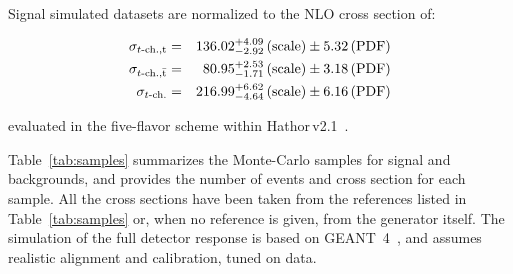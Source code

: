 
  
   
\clearpage

Signal simulated datasets are normalized to the NLO cross section of:

\begin{eqnarray}
\label{eq:sigmatot}
 \sigma_{t\textrm{-ch.,t}} &=&  136.02   ^{+4.09}_{-2.92}\,\textrm{(scale)}  \pm 5.32 \,\textrm{(PDF)}\nonumber\\
 \sigma_{t\textrm{-ch.,}\bar{\textrm{t}}} &=&  80.95   ^{+2.53}_{-1.71}\, \textrm{(scale)} \pm 3.18\,\textrm{(PDF)}\nonumber\\
 \sigma_{t\textrm{-ch.}} &=&  216.99   ^{+6.62}_{-4.64}\, \textrm{(scale)}  \pm 6.16 \,\textrm{(PDF)}
\end{eqnarray}

evaluated in the five-flavor scheme within {\sc Hathor}\,v2.1~\cite{HATOR,tchanxsec}. 


Table~\ref{tab:samples} summarizes the Monte-Carlo samples for signal and backgrounds, and provides the number of events and cross section for each sample. 
All the cross sections have been taken from the references listed in Table~\ref{tab:samples} or, when no reference is given, from the generator itself.
The simulation of the full detector response is based on GEANT~4~\cite{geant}, and assumes realistic alignment and calibration, tuned on data.




